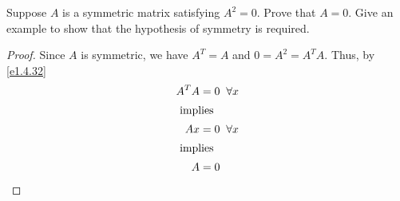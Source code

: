 \begin{exercise} \label{e1.4.33}
    Suppose \( A \) is a symmetric matrix satisfying \( A^2 = 0 \). Prove that \( A = 0 \). Give an example to show that the hypothesis of symmetry is required.
    
    \begin{proof}
        Since \( A \) is symmetric, we have \( A^T = A \) and \( 0 = A^2 = A^TA \). Thus, by \ref{e1.4.32}
        \begin{align*}
            A^TA &= 0 \hspace{2mm} \forall x \\
            \intertext{ implies }
            Ax &= 0 \hspace{2mm} \forall x \\
            \intertext{ implies }
            A &= 0
        \end{align*}
    \end{proof}
\end{exercise} %

